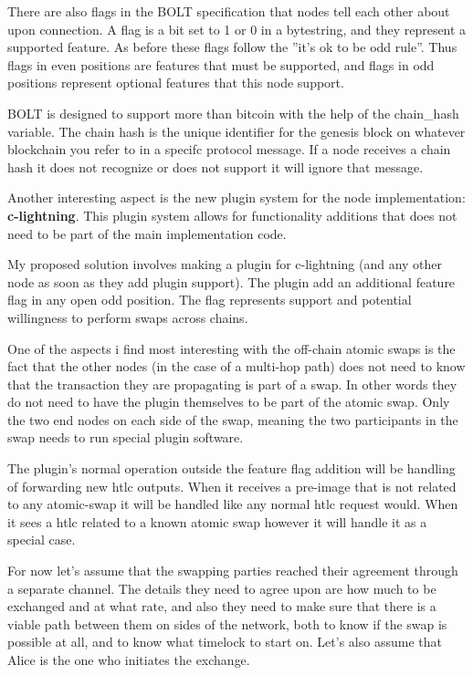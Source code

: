 There are also flags in the BOLT specification that nodes tell each other about
upon connection. A flag is a bit set to 1 or 0 in a bytestring, and they 
represent a supported feature. As before these
flags follow the ''it's ok to be odd rule''. Thus flags in even positions are 
features that must be supported, and flags in odd positions represent optional
features that this node support.

BOLT is designed to support more than bitcoin with the help of the chain\_hash 
variable. The chain hash is the unique identifier for the genesis block on
whatever blockchain you refer to in a specifc protocol message. If a node
receives a chain hash it does not recognize or does not support it will ignore
that message.

Another interesting aspect is the new plugin system for the node implementation: 
\textbf{c-lightning}. This plugin system allows for functionality additions that
does not need to be part of the main implementation code. 

My proposed solution involves making a plugin for c-lightning (and any other 
node as soon as they add plugin support). The plugin add an additional 
feature flag in any open odd position. The flag represents support and potential
willingness to perform swaps across chains. 

One of the aspects i find most interesting with the off-chain atomic swaps is
the fact that the other nodes (in the case of a multi-hop path) does not need
to know that the transaction they are propagating is part of a swap. In other 
words they do not need to have the plugin themselves to be part of the atomic
swap. Only the two end nodes on each side of the swap, meaning the two 
participants in the swap needs to run special plugin software. 

The plugin's normal operation outside the feature flag addition will be handling 
of forwarding new htlc outputs. When it receives a pre-image that is not related 
to any atomic-swap it will be handled like any normal htlc request would. 
When it sees a htlc related to a known atomic swap however it will handle it as 
a special case.

For now let's assume that the swapping parties reached their agreement through 
a separate channel. The details they need to agree upon are how much to be 
exchanged and at what rate, and also they need to make sure that there is a 
viable path between them on sides of the network, both to know if the swap 
is possible at all, and to know what timelock to start on. Let's also 
assume that Alice is the one who initiates the exchange.

